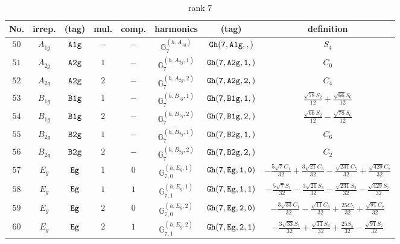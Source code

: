 \documentclass[fleqn,8pt]{jsarticle}
\begin{document}
\begin{table}[ht!]
\begin{center}
\caption{rank 7}
\renewcommand{\arraystretch}{1.3}
\begin{tabular}{cccccccc} \hline \hline
No. & irrep. & (tag) & mul. & comp. & harmonics & (tag) & definition \\ \hline
$ 50 $ & $ A_{1g} $ & $ {\tt A1g} $ & $ - $ & $ - $ & $ \mathbb{G}_{7}^{(h,A_{1g})} $ & $ {\tt Gh(7,A1g,,)} $ & $ S_{4} $ \\
$ 51 $ & $ A_{2g} $ & $ {\tt A2g} $ & $ 1 $ & $ - $ & $ \mathbb{G}_{7}^{(h,A_{2g},1)} $ & $ {\tt Gh(7,A2g,1,)} $ & $ C_{0} $ \\
$ 52 $ & $ A_{2g} $ & $ {\tt A2g} $ & $ 2 $ & $ - $ & $ \mathbb{G}_{7}^{(h,A_{2g},2)} $ & $ {\tt Gh(7,A2g,2,)} $ & $ C_{4} $ \\
$ 53 $ & $ B_{1g} $ & $ {\tt B1g} $ & $ 1 $ & $ - $ & $ \mathbb{G}_{7}^{(h,B_{1g},1)} $ & $ {\tt Gh(7,B1g,1,)} $ & $ \frac{\sqrt{78} S_{2}}{12} + \frac{\sqrt{66} S_{6}}{12} $ \\
$ 54 $ & $ B_{1g} $ & $ {\tt B1g} $ & $ 2 $ & $ - $ & $ \mathbb{G}_{7}^{(h,B_{1g},2)} $ & $ {\tt Gh(7,B1g,2,)} $ & $ \frac{\sqrt{66} S_{2}}{12} - \frac{\sqrt{78} S_{6}}{12} $ \\
$ 55 $ & $ B_{2g} $ & $ {\tt B2g} $ & $ 1 $ & $ - $ & $ \mathbb{G}_{7}^{(h,B_{2g},1)} $ & $ {\tt Gh(7,B2g,1,)} $ & $ C_{6} $ \\
$ 56 $ & $ B_{2g} $ & $ {\tt B2g} $ & $ 2 $ & $ - $ & $ \mathbb{G}_{7}^{(h,B_{2g},2)} $ & $ {\tt Gh(7,B2g,2,)} $ & $ C_{2} $ \\
$ 57 $ & $ E_{g} $ & $ {\tt Eg} $ & $ 1 $ & $ 0 $ & $ \mathbb{G}_{7,0}^{(h,E_{g},1)} $ & $ {\tt Gh(7,Eg,1,0)} $ & $ - \frac{5 \sqrt{7} C_{1}}{32} + \frac{3 \sqrt{21} C_{3}}{32} - \frac{\sqrt{231} C_{5}}{32} + \frac{\sqrt{429} C_{7}}{32} $ \\
$ 58 $ & $ E_{g} $ & $ {\tt Eg} $ & $ 1 $ & $ 1 $ & $ \mathbb{G}_{7,1}^{(h,E_{g},1)} $ & $ {\tt Gh(7,Eg,1,1)} $ & $ - \frac{5 \sqrt{7} S_{1}}{32} - \frac{3 \sqrt{21} S_{3}}{32} - \frac{\sqrt{231} S_{5}}{32} - \frac{\sqrt{429} S_{7}}{32} $ \\
$ 59 $ & $ E_{g} $ & $ {\tt Eg} $ & $ 2 $ & $ 0 $ & $ \mathbb{G}_{7,0}^{(h,E_{g},2)} $ & $ {\tt Gh(7,Eg,2,0)} $ & $ - \frac{3 \sqrt{33} C_{1}}{32} - \frac{\sqrt{11} C_{3}}{32} + \frac{25 C_{5}}{32} + \frac{\sqrt{91} C_{7}}{32} $ \\
$ 60 $ & $ E_{g} $ & $ {\tt Eg} $ & $ 2 $ & $ 1 $ & $ \mathbb{G}_{7,1}^{(h,E_{g},2)} $ & $ {\tt Gh(7,Eg,2,1)} $ & $ - \frac{3 \sqrt{33} S_{1}}{32} + \frac{\sqrt{11} S_{3}}{32} + \frac{25 S_{5}}{32} - \frac{\sqrt{91} S_{7}}{32} $ \\

\end{tabular}
\end{center}
\end{table}
\end{document}
